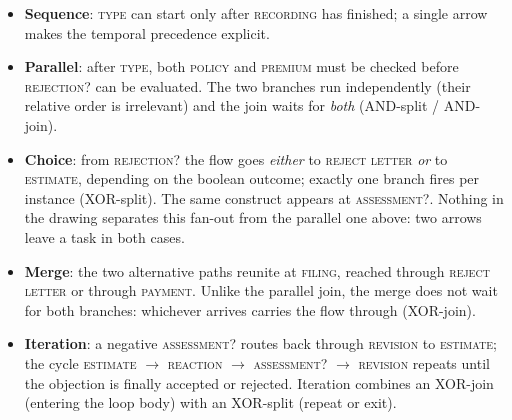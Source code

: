 \begin{itemize}
  \item \textbf{Sequence}: \textsc{type} can start only after \textsc{recording} has finished; a single arrow makes the temporal precedence explicit.
  \item \textbf{Parallel}: after \textsc{type}, both \textsc{policy} and \textsc{premium} must be checked before \textsc{rejection?} can be evaluated. The two branches run independently (their relative order is irrelevant) and the join waits for \emph{both} (AND-split / AND-join).
  \item \textbf{Choice}: from \textsc{rejection?} the flow goes \emph{either} to \textsc{reject letter} \emph{or} to \textsc{estimate}, depending on the boolean outcome; exactly one branch fires per instance (XOR-split). The same construct appears at \textsc{assessment?}. Nothing in the drawing separates this fan-out from the parallel one above: two arrows leave a task in both cases.
  \item \textbf{Merge}: the two alternative paths reunite at \textsc{filing}, reached through \textsc{reject letter} or through \textsc{payment}. Unlike the parallel join, the merge does not wait for both branches: whichever arrives carries the flow through (XOR-join).
  \item \textbf{Iteration}: a negative \textsc{assessment?} routes back through \textsc{revision} to \textsc{estimate}; the cycle \textsc{estimate} $\rightarrow$ \textsc{reaction} $\rightarrow$ \textsc{assessment?} $\rightarrow$ \textsc{revision} repeats until the objection is finally accepted or rejected. Iteration combines an XOR-join (entering the loop body) with an XOR-split (repeat or exit).
\end{itemize}


\begin{center}
\end{center}

